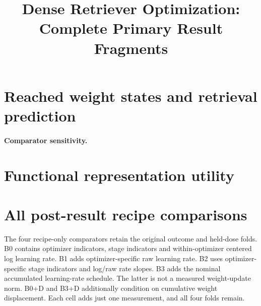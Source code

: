\documentclass[10pt,twocolumn]{article}
\title{Dense Retriever Optimization: Complete Primary Result Fragments}
\author{}
\date{}
\begin{document}
\maketitle
\CorrectedMainSection
\section{Reached weight states and retrieval prediction}
\CorrectedWeightSpaceFinding

\CorrectedGeometryBridgeFinding

\paragraph{Comparator sensitivity.}
\RecipeSensitivityFinding
\CorrectedGeometryBridgeTable
\section{Functional representation utility}
\DimensionUtilizationFinding

\DimensionRetrievalBridgeFinding

\DimensionConclusionFinding
\DimensionUtilizationFigure
\DimensionUtilizationAppendixTable
\onecolumn
\raggedbottom
\renewenvironment{table*}[1][]{\begin{table}[H]}{\end{table}}
\section{All post-result recipe comparisons}
The four recipe-only comparators retain the original outcome and held-dose
folds. B0 contains optimizer indicators, stage indicators and within-optimizer
centered log learning rate. B1 adds optimizer-specific raw learning rate.
B2 uses optimizer-specific stage indicators and log/raw rate slopes. B3 adds
the nominal accumulated learning-rate schedule. The latter is not a measured
weight-update norm. B0+D and B3+D additionally condition on cumulative weight
displacement. Each cell adds just one measurement, and all four folds remain.
\WeightRecipeSensitivityTable
\FunctionalRecipeSensitivityTable
\clearpage
\end{document}
